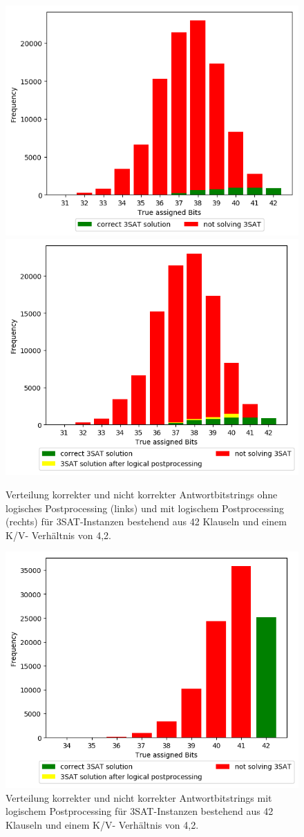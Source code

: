 \documentclass[runningheads]{llncs}
\begin{document}
\begin{figure}
\includegraphics[width=.5\textwidth]{../material_2/Plots/42_4_2_def_engl_color_ohne_transform.png}%
\includegraphics[width=.5\textwidth]{../material_2/Plots/42_4_2_def_engl_color_mit_transform.png}
\caption{Verteilung korrekter und nicht korrekter Antwortbitstrings ohne logisches Postprocessing (links) und mit logischem Postprocessing (rechts) für 3SAT-Instanzen bestehend aus 42 Klauseln und einem K/V- Verhältnis von 4,2.} \label{fig:distr}
\end{figure}

\begin{figure}
\centering
\includegraphics[width=.8\textwidth]{../material_2/Plots/42_4_2_opt_engl_color_mit_transform.png}
\caption{Verteilung korrekter und nicht korrekter Antwortbitstrings mit logischem Postprocessing für 3SAT-Instanzen bestehend aus 42 Klauseln und einem K/V- Verhältnis von 4,2.} \label{fig:distr}
\end{figure}
\end{document}
